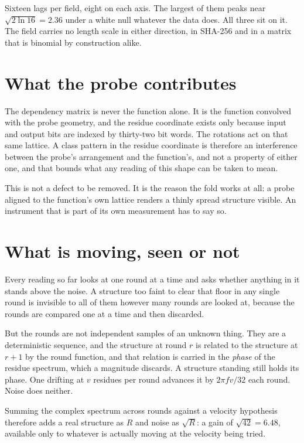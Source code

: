 Sixteen lags per field, eight on each axis. The largest of them peaks near
\(\sqrt{2 \ln 16} = 2.36\) under a white null whatever the data does. All three sit on it. The
field carries no length scale in either direction, in SHA-256 and in a matrix that is binomial by
construction alike.

\section{What the probe contributes}

The dependency matrix is never the function alone. It is the function convolved with the probe
geometry, and the residue coordinate exists only because input and output bits are indexed by
thirty-two bit words. The rotations act on that same lattice. A class pattern in the residue
coordinate is therefore an interference between the probe's arrangement and the function's, and not
a property of either one, and that bounds what any reading of this shape can be taken to mean.

This is not a defect to be removed. It is the reason the fold works at all: a probe aligned to the
function's own lattice renders a thinly spread structure visible. An instrument that is part of its
own measurement has to say so.

\section{What is moving, seen or not}

Every reading so far looks at one round at a time and asks whether anything in it stands above
the noise. A structure too faint to clear that floor in any single round is invisible to all of
them however many rounds are looked at, because the rounds are compared one at a time and then
discarded.

But the rounds are not independent samples of an unknown thing. They are a deterministic sequence,
and the structure at round \(r\) is related to the structure at \(r+1\) by the round function, and
that relation is carried in the \emph{phase} of the residue spectrum, which a magnitude discards. A
structure standing still holds its phase. One drifting at \(v\) residues per round advances it by
\(2\pi f v / 32\) each round. Noise does neither.

Summing the complex spectrum across rounds against a velocity hypothesis therefore adds a real
structure as \(R\) and noise as \(\sqrt{R}\): a gain of \(\sqrt{42} = 6.48\), available only to
whatever is actually moving at the velocity being tried.

